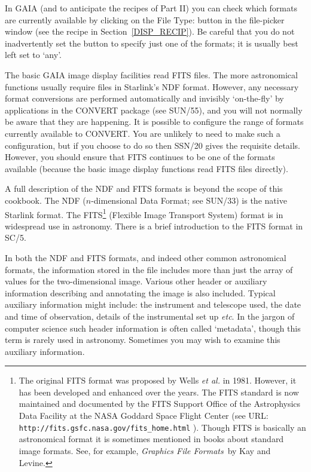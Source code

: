 \documentclass[twoside,11pt]{article}
\newcommand{\htmladdnormallink}[2]{#1}
\newcommand{\xref}[3]{#1}
\begin{document}
In GAIA (and to anticipate the recipes of Part II) you can check which
formats are currently available by clicking on the {\sf File Type:} button
in the file-picker window (see the recipe in Section~\ref{DISP_RECIP}).
Be careful that you do not inadvertently set the button to specify just one
of the formats; it is usually best left set to `{\sf any}'.

The basic GAIA image display facilities read FITS files.  The more
astronomical functions usually require files in Starlink's NDF format.
However, any necessary format conversions are performed automatically and
invisibly `on-the-fly' by applications in the CONVERT package (see
\xref{SUN/55}{sun55}{}\cite{SUN55}), and you will not normally be aware
that they are happening.  It is possible to configure the range of formats
currently available to CONVERT.  You are unlikely to need to make such a
configuration, but if you choose to do so then
\xref{SSN/20}{ssn20}{}\cite{SSN20} gives the requisite details.  However,
you should ensure that FITS continues to be one of the formats available
(because the basic image display functions read FITS files directly).

A full description of the NDF and FITS formats is beyond the scope of this
cookbook.  The NDF ($n$-dimensional Data Format; see
\xref{SUN/33}{sun33}{}\cite{SUN33}) is the native Starlink format.
The FITS\footnote{The original FITS format was proposed by Wells {\it et
al.}\/\cite{WELLS81} in 1981.  However, it has been developed and enhanced
over the years.  The FITS standard is now maintained and documented by the
FITS Support Office of the Astrophysics Data Facility at the NASA Goddard
Space Flight Center (see URL:
\htmladdnormallink{ {\tt http://fits.gsfc.nasa.gov/fits\_home.html} }
{http://fits.gsfc.nasa.gov/fits_home.html}).
Though FITS is basically an astronomical format it is sometimes mentioned
in books about standard image formats.  See, for example, {\it Graphics
File Formats}\, by Kay and Levine\cite{KAY95}.} (Flexible Image Transport
System) format is in widespread use in astronomy.  There is a brief
\xref{introduction to the FITS format}{sc5}{FITS} in
\xref{SC/5}{sc5}{}\cite{SC5}.

In both the NDF and FITS formats, and indeed other common astronomical
formats, the information stored in the file includes more than just the
array of values for the two-dimensional image.  Various other header or
auxiliary information describing and annotating the image is also included.
Typical auxiliary information might include: the instrument and telescope
used, the date and time of observation, details of the instrumental set up
\emph{etc}.  In the jargon of computer science such header information is
often called `metadata', though this term is rarely used in astronomy.
Sometimes you may wish to examine this auxiliary information.
\end{document}
